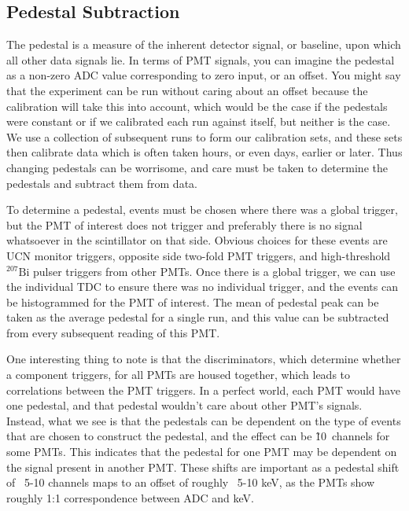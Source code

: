 \subsection{Pedestal Subtraction}
The pedestal is a measure of the inherent detector signal, or baseline, 
upon which all other data signals lie. In terms of PMT signals, you can imagine 
the pedestal as a non-zero ADC value corresponding to zero input, or an offset.
You might say that the experiment can be run without caring about an offset
because the calibration will take this into account, which would be the case 
if the pedestals were constant or if we calibrated each run against itself, but 
neither is the case. We use a collection of subsequent runs to form our 
calibration sets, and these sets then calibrate data which is often taken hours,
or even days, earlier or later. Thus changing pedestals can be worrisome, and care
must be taken to determine the pedestals and subtract them from data.

To determine a pedestal, events must be chosen where there was a global trigger, but
the PMT of interest does not trigger and preferably there is no signal
whatsoever in the scintillator on that side. Obvious choices for these events are
UCN monitor triggers, opposite side two-fold PMT triggers, and high-threshold $^{207}\mathrm{Bi}$
pulser triggers from other PMTs. Once there is a global trigger, we can use the individual TDC
to ensure there was no individual trigger, and the events can be 
histogrammed for the PMT of interest. The mean of pedestal
peak can be taken as the average pedestal for a single run,
and this value can be 
subtracted from every subsequent reading of this PMT.

One interesting thing to note is that the discriminators, which determine whether
a component triggers,
for all PMTs are housed 
together, which leads to correlations between the PMT triggers. In a perfect world, 
each PMT would have one pedestal, and that pedestal wouldn't care about other PMT's signals.
Instead, what we see is that the pedestals
can be dependent on the type of events that are chosen 
to construct the pedestal, and the effect can be \~10~channels for some PMTs.
This indicates that the pedestal for one PMT may be dependent
on the signal present in another PMT. These shifts are important as a
pedestal shift of ~5-10 channels maps to an offset of roughly
~5-10 keV, as the PMTs show roughly 1:1 correspondence between ADC and keV.

